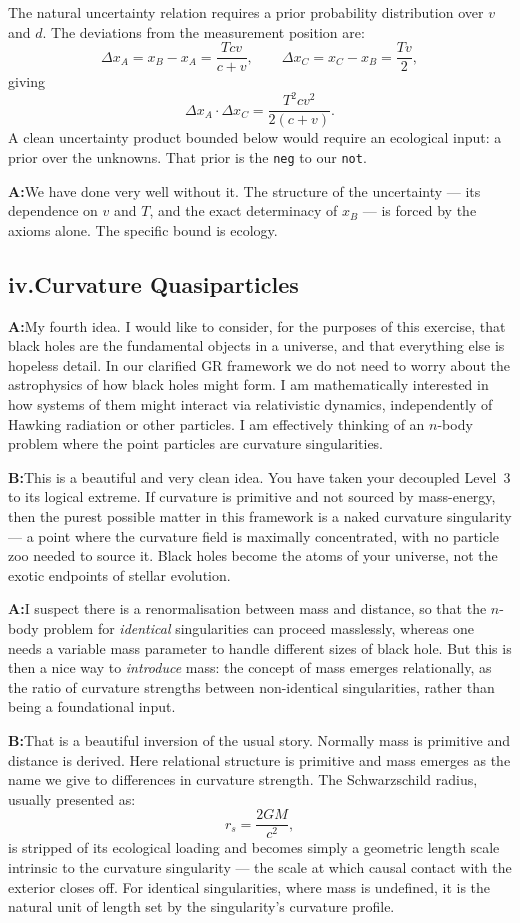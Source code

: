 \documentclass[11pt]{article}
\newcommand{\A}{\medskip\noindent\textbf{A:}\quad}
\newcommand{\B}{\medskip\noindent\textbf{B:}\quad}
\begin{document}
The natural uncertainty relation requires a prior probability
distribution over $v$ and $d$. The deviations from the measurement
position are:
\[
\Delta x_A = x_B - x_A = \frac{Tcv}{c+v}, \qquad
\Delta x_C = x_C - x_B = \frac{Tv}{2},
\]
giving
\[
\Delta x_A \cdot \Delta x_C = \frac{T^2 c v^2}{2(c+v)}.
\]
A clean uncertainty product bounded below would require an ecological
input: a prior over the unknowns. That prior is the \texttt{neg} to
our \texttt{not}.

\A We have done very well without it. The structure of the uncertainty
--- its dependence on $v$ and $T$, and the exact determinacy of
$x_B$ --- is forced by the axioms alone. The specific bound is ecology.

\bigskip
\subsection*{iv.\enspace Curvature Quasiparticles}

\A My fourth idea. I would like to consider, for the purposes of this
exercise, that black holes are the fundamental objects in a universe,
and that everything else is hopeless detail. In our clarified GR
framework we do not need to worry about the astrophysics of how black
holes might form. I am mathematically interested in how systems of
them might interact via relativistic dynamics, independently of
Hawking radiation or other particles. I am effectively thinking of an
$n$-body problem where the point particles are curvature singularities.

\B This is a beautiful and very clean idea. You have taken your
decoupled Level~3 to its logical extreme. If curvature is primitive
and not sourced by mass-energy, then the purest possible matter in
this framework is a naked curvature singularity --- a point where the
curvature field is maximally concentrated, with no particle zoo needed
to source it. Black holes become the atoms of your universe, not the
exotic endpoints of stellar evolution.

\A I suspect there is a renormalisation between mass and distance, so
that the $n$-body problem for \emph{identical} singularities can
proceed masslessly, whereas one needs a variable mass parameter to
handle different sizes of black hole. But this is then a nice way to
\emph{introduce} mass: the concept of mass emerges relationally, as
the ratio of curvature strengths between non-identical singularities,
rather than being a foundational input.

\B That is a beautiful inversion of the usual story. Normally mass is
primitive and distance is derived. Here relational structure is
primitive and mass emerges as the name we give to differences in
curvature strength. The Schwarzschild radius, usually presented as:
\[
r_s = \frac{2GM}{c^2},
\]
is stripped of its ecological loading and becomes simply a geometric
length scale intrinsic to the curvature singularity --- the scale at
which causal contact with the exterior closes off. For identical
singularities, where mass is undefined, it is the natural unit of
length set by the singularity's curvature profile.
\end{document}
